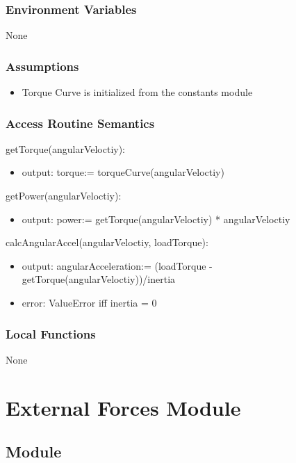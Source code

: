 \documentclass[12pt, titlepage]{article}
\begin{document}
\subsubsection{Environment Variables}

None

\subsubsection{Assumptions}
\begin{itemize}
  \item Torque Curve is initialized from the constants module
\end{itemize}

\subsubsection{Access Routine Semantics}

\noindent getTorque(angularVeloctiy):
\begin{itemize}
\item output: torque:= torqueCurve(angularVeloctiy) 
\end{itemize}

\noindent getPower(angularVeloctiy):
\begin{itemize}
\item output: power:= getTorque(angularVeloctiy) * angularVeloctiy
\end{itemize}

\noindent calcAngularAccel(angularVeloctiy, loadTorque):
\begin{itemize}
\item output: angularAcceleration:= (loadTorque - getTorque(angularVeloctiy))/inertia
\item error: ValueError iff inertia = 0
\end{itemize}

\subsubsection{Local Functions}

None

\newpage

\section{External Forces Module} \label{Module_external_forces} 

\subsection{Module}
\end{document}
